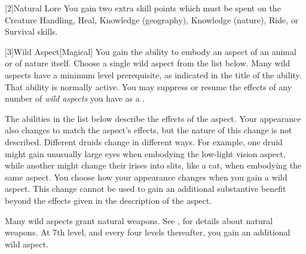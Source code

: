             [2]{Natural Lore}
            You gain two extra skill points which must be spent on the Creature Handling, Heal, Knowledge (geography), Knowledge (nature), Ride, or Survival skills.

            [3]{Wild Aspect}[Magical]
            You gain the ability to embody an aspect of an animal or of nature itself.
            Choose a single wild aspect from the list below.
            Many wild aspects have a minimum level prerequisite, as indicated in the title of the ability.
            That ability is normally active.
            You may suppress or resume the effects of any number of \textit{wild aspects} you have as a .

            The abilities in the list below describe the effects of the aspect.
            Your appearance also changes to match the aspect's effects, but the nature of this change is not described.
            Different druids change in different ways.
            For example, one druid might gain unusually large eyes when embodying the low-light vision aspect, while another might change their irises into slits, like a cat, when embodying the same aspect.
            You choose how your appearance changes when you gain a wild aspect.
            This change cannot be used to gain an additional substantive benefit beyond the effects given in the description of the aspect.

            Many wild aspects grant natural weapons.
            See , for details about natural weapons.
            At 7th level, and every four levels thereafter, you gain an additional wild aspect.

